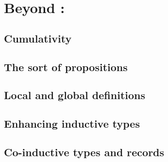 \section{Beyond : }

\subsection{Cumulativity}

\subsection{The sort of propositions}

\subsection{Local and global definitions}

\subsection{Enhancing inductive types}

\subsection{Co-inductive types and records}
